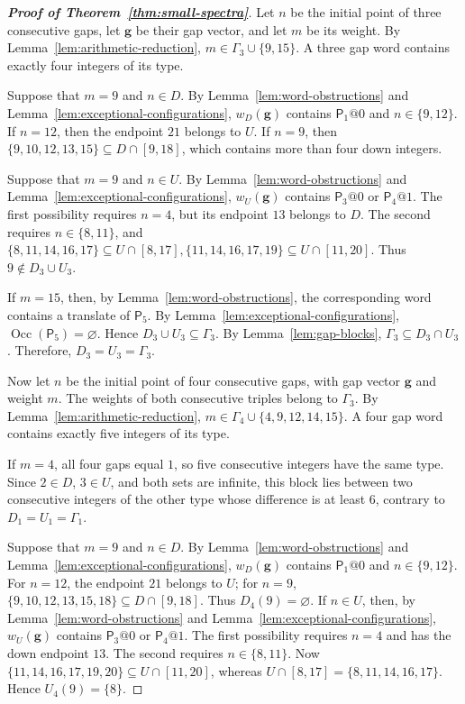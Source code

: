 \documentclass[11pt]{amsart}
\theoremstyle{definition}
\begin{document}
\begin{proof}[\bf Proof of Theorem~\ref{thm:small-spectra}]
Let $n$ be the initial point of three consecutive gaps, let $\mathbf g$
be their gap vector, and let $m$ be its weight. By Lemma~\ref{lem:arithmetic-reduction}, $m\in\Gamma_3\cup\{9,15\}$.
A three gap word contains exactly four integers of its type.

Suppose that $m=9$ and $n\in D$. By
Lemma~\ref{lem:word-obstructions} and
Lemma~\ref{lem:exceptional-configurations}, $w_D(\mathbf g)$ contains
$\mathsf P_1@0$ and $n\in\{9,12\}$. If $n=12$, then the endpoint
$21$ belongs to $U$. If $n=9$, then $\{9,10,12,13,15\}\subseteq D\cap[9,18]$,
which contains more than four down integers.

Suppose that $m=9$ and $n\in U$. By
Lemma~\ref{lem:word-obstructions} and
Lemma~\ref{lem:exceptional-configurations}, $w_U(\mathbf g)$ contains
$\mathsf P_3@0$ or $\mathsf P_4@1$. The first possibility requires
$n=4$, but its endpoint $13$ belongs to $D$. The second requires
$n\in\{8,11\}$, and $\{8,11,14,16,17\}\subseteq U\cap[8,17], \{11,14,16,17,19\}\subseteq U\cap[11,20]$. Thus $9\notin D_3\cup U_3$.

If $m=15$, then, by Lemma~\ref{lem:word-obstructions}, the corresponding
word contains a translate of $\mathsf P_5$. By
Lemma~\ref{lem:exceptional-configurations},
$\operatorname{Occ}(\mathsf P_5)=\varnothing$. Hence $D_3\cup U_3\subseteq\Gamma_3$.
By Lemma~\ref{lem:gap-blocks},
$\Gamma_3\subseteq D_3\cap U_3$. Therefore, $D_3=U_3=\Gamma_3$.

Now let $n$ be the initial point of four consecutive gaps, with gap
vector $\mathbf g$ and weight $m$. The weights of both consecutive
triples belong to $\Gamma_3$. By Lemma~\ref{lem:arithmetic-reduction}, $m\in\Gamma_4\cup\{4,9,12,14,15\}$.
A four gap word contains exactly five integers of its type.

If $m=4$, all four gaps equal $1$, so five consecutive integers have
the same type. Since $2\in D$, $3\in U$, and both sets are infinite,
this block lies between two consecutive integers of the other type
whose difference is at least $6$, contrary to
$D_1=U_1=\Gamma_1$.

Suppose that $m=9$ and $n\in D$. By
Lemma~\ref{lem:word-obstructions} and
Lemma~\ref{lem:exceptional-configurations}, $w_D(\mathbf g)$ contains
$\mathsf P_1@0$ and $n\in\{9,12\}$. For $n=12$, the endpoint $21$
belongs to $U$; for $n=9$, $\{9,10,12,13,15,18\}\subseteq D\cap[9,18]$.
Thus $D_4(9)=\varnothing$. If $n\in U$, then, by
Lemma~\ref{lem:word-obstructions} and
Lemma~\ref{lem:exceptional-configurations}, $w_U(\mathbf g)$ contains
$\mathsf P_3@0$ or $\mathsf P_4@1$. The first possibility requires
$n=4$ and has the down endpoint $13$. The second requires
$n\in\{8,11\}$. Now $\{11,14,16,17,19,20\}\subseteq U\cap[11,20]$,
whereas $U\cap[8,17]=\{8,11,14,16,17\}$.
Hence $U_4(9)=\{8\}$.


\end{proof}
\end{document}
